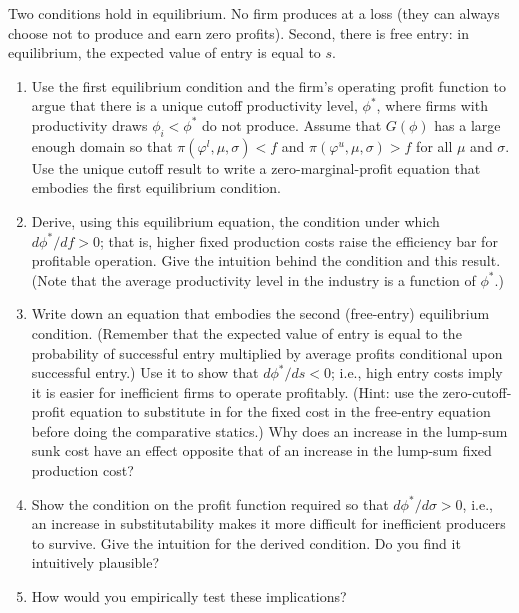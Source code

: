 \documentclass[10pt]{article}
\begin{document}
Two conditions hold in equilibrium. No firm produces at a loss (they can always choose not to produce and earn zero profits). Second, there is free entry: in equilibrium, the expected value of entry is equal to $s$.

\begin{enumerate}[label=\alph*.]
    \item Use the first equilibrium condition and the firm's operating profit function to argue that there is a unique cutoff productivity level, $\phi^*$, where firms with productivity draws $\phi_i<\phi^*$ do not produce. Assume that $G(\phi)$ has a large enough domain so that $\pi\left(\varphi^l, \mu, \sigma\right)<f$ and $\pi\left(\varphi^u, \mu, \sigma\right)>f$ for all $\mu$ and $\sigma$. Use the unique cutoff result to write a zero-marginal-profit equation that embodies the first equilibrium condition.
    \item Derive, using this equilibrium equation, the condition under which $d \phi^* / d f>0$; that is, higher fixed production costs raise the efficiency bar for profitable operation. Give the intuition behind the condition and this result. (Note that the average productivity level in the industry is a function of $\phi^*$.)
    \item Write down an equation that embodies the second (free-entry) 
        equilibrium condition. (Remember that the expected value of entry is equal 
        to the probability of successful entry multiplied by average profits 
        conditional upon successful entry.) Use it to show that $d \phi^* / d s<0$; 
        i.e., high entry costs imply it is easier for inefficient firms to operate 
        profitably. (Hint: use the zero-cutoff-profit equation to substitute in for 
        the fixed cost in the free-entry equation before doing the comparative statics.) Why does an increase in the lump-sum sunk cost have an effect opposite that of an increase in the lump-sum fixed production cost?
    \item Show the condition on the profit function required so that $d \phi^* / d \sigma>0$, i.e., an increase in substitutability makes it more difficult for inefficient producers to survive. Give the intuition for the derived condition. Do you find it intuitively plausible?
    \item How would you empirically test these implications?
\end{enumerate}

\hrulefill\hspace{0.5em}\dotfill\hspace{0.5em}\hrulefill
\end{document}
